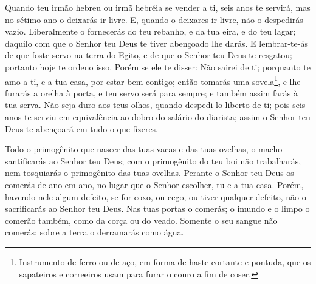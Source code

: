 Quando teu irmão hebreu ou irmã hebréia se vender a ti, seis anos
te servirá, mas no sétimo ano o deixarás ir livre. E, quando
o deixares ir livre, não o despedirás vazio. Liberalmente o
fornecerás do teu rebanho, e da tua eira, e do teu lagar; daquilo
com que o Senhor teu Deus te tiver abençoado lhe darás. E
lembrar-te-ás de que foste servo na terra do Egito, e de que o
Senhor teu Deus te resgatou; portanto hoje te ordeno isso.
Porém se ele te disser: Não sairei de ti; porquanto te amo a
ti, e a tua casa, por estar bem contigo; então tomarás uma
sovela\footnote{Instrumento de ferro ou de aço, em forma de haste
cortante e pontuda, que os sapateiros e correeiros usam para furar o
couro a fim de coser.}, e lhe furarás a orelha à porta, e teu servo
será para sempre; e também assim farás à tua serva. Não seja
duro aos teus olhos, quando despedi-lo liberto de ti; pois seis anos
te serviu em equivalência ao dobro do salário do diarista; assim o
Senhor teu Deus te abençoará em tudo o que fizeres.

Todo o primogênito que nascer das tuas vacas e das tuas ovelhas,
o macho santificarás ao Senhor teu Deus; com o primogênito do teu
boi não trabalharás, nem tosquiarás o primogênito das tuas ovelhas.
Perante o Senhor teu Deus os comerás de ano em ano, no lugar
que o Senhor escolher, tu e a tua casa. Porém, havendo nele
algum defeito, se for coxo, ou cego, ou tiver qualquer defeito, não
o sacrificarás ao Senhor teu Deus. Nas tuas portas o comerás;
o imundo e o limpo o comerão também, como da corça ou do veado.
Somente o seu sangue não comerás; sobre a terra o derramarás
como água.

\medskip

